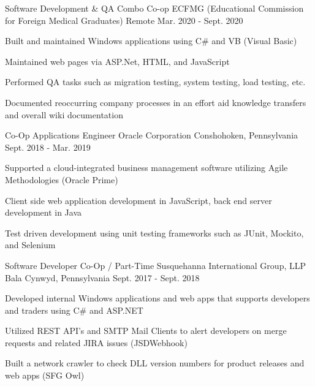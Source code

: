 

\begin{cventries}
  \cventry
    {Software Development \& QA Combo Co-op} %
    {ECFMG (Educational Commission for Foreign Medical Graduates)} %
    {Remote} %
    {Mar. 2020 - Sept. 2020} %
    {
      \begin{cvitems} %
        \item Built and maintained Windows applications using C\# and VB (Visual Basic)
        \item Maintained web pages via ASP.Net, HTML, and JavaScript
        \item Performed QA tasks such as migration testing, system testing, load testing, etc.
        \item Documented reoccurring company processes in an effort aid knowledge transfers and overall wiki documentation
      \end{cvitems}
    }

  \cventry
    {Co-Op Applications Engineer} %
    {Oracle Corporation} %
    {Conshohoken, Pennsylvania} %
    {Sept. 2018 - Mar. 2019} %
    {
      \begin{cvitems} %
        \item Supported a cloud-integrated business management software utilizing Agile Methodologies (Oracle Prime)
        \item Client side web application development in JavaScript, back end server development in Java
        \item Test driven development using unit testing frameworks such as JUnit, Mockito, and Selenium
      \end{cvitems}
    }

  \cventry
    {Software Developer Co-Op / Part-Time} %
    {Susquehanna International Group, LLP} %
    {Bala Cynwyd, Pennsylvania} %
    {Sept. 2017 - Sept. 2018} %
    {
      \begin{cvitems} %
        \item Developed internal Windows applications and web apps that supports developers and traders using C\# and ASP.NET
        \item Utilized REST API's and SMTP Mail Clients to alert developers on merge requests and related JIRA issues (JSDWebhook)
        \item Built a network crawler to check DLL version numbers for product releases and web apps (SFG Owl)
      \end{cvitems}
    }


\end{cventries}
